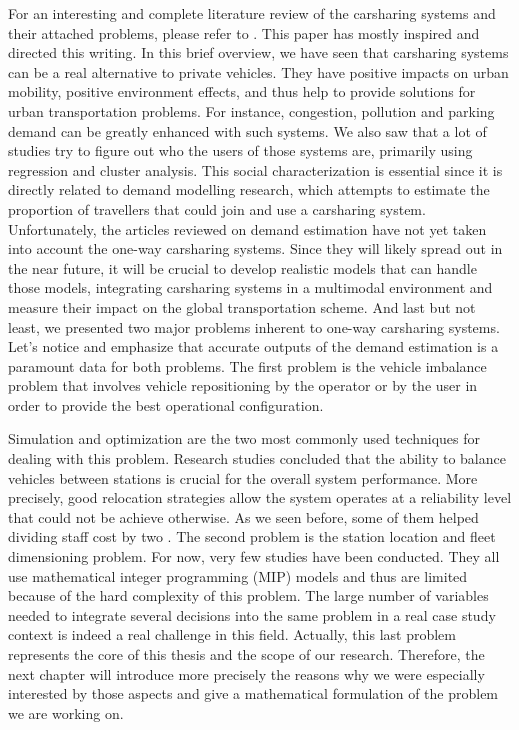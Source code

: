 \begin{bibunit}[ieeetr]
For an interesting and complete literature review of the carsharing systems and their attached problems, please refer to \cite{jorge_carsharing_2013}.
This paper has mostly inspired and directed this writing.
In this brief overview, we have seen that carsharing systems can be a real alternative to private vehicles.
They have positive impacts on urban mobility, positive environment effects, and thus help to provide solutions for urban transportation problems.
For instance, congestion, pollution and parking demand can be greatly enhanced with such systems.
We also saw that a lot of studies try to figure out who the users of those systems are, primarily
using regression and cluster analysis.
This social characterization is essential since it is directly related to demand modelling research, which attempts to estimate the proportion of
travellers that could join and use a carsharing system.
Unfortunately, the articles reviewed on demand estimation have not yet taken into account the one-way carsharing systems.
Since they will likely spread out in the near future, it will be crucial to develop realistic models that can handle those models, integrating carsharing systems in a multimodal environment and measure their impact on the global transportation scheme.
And last but not least, we presented two major problems inherent to one-way carsharing systems.
Let's notice and emphasize that accurate outputs of the demand estimation is a paramount data for both problems.
The first problem is the vehicle imbalance problem that involves vehicle repositioning by the operator or by the user in order to provide the best operational configuration.

Simulation and optimization are the two most commonly used techniques for dealing with this problem.
Research studies concluded that the ability to balance vehicles between stations is crucial for the overall system performance.
More precisely, good relocation strategies allow the system operates at a reliability level that could not be achieve otherwise.
As we seen before, some of them helped dividing staff cost by two \cite{kek_decision_2009}.
The second problem is the station location and  fleet dimensioning problem.
For now, very few studies have been conducted.
They all use mathematical integer programming (MIP) models and thus are limited because of the hard complexity of this problem.
The large number of variables needed to integrate several decisions into the same problem in a real case study context is indeed a real challenge in this field.
Actually, this last problem represents the core of this thesis and the scope of our research.
Therefore, the next chapter will introduce more precisely the reasons why we were especially interested by those aspects and give a mathematical formulation of the problem we are working on.



\end{bibunit}
